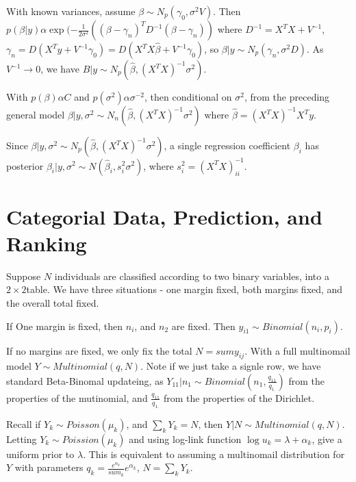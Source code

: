 With known variances, assume $\beta \sim N_{p}(\gamma_{0}, \sigma^{2}
V)$.  Then $p(\beta | y) \alpha \exp(-\frac{1}{2 \sigma^{2}} ((\beta -
\gamma_{n})^{T} D^{-1} (\beta - \gamma_{n}))$ where $D^{-1} = X^{T} X
+ V^{-1}$, $\gamma_{n} = D(X^{T} y + V^{-1} \gamma_{0}) = D(X^{T} X
\hat \beta + V^{-1} \gamma_{0})$, so $\beta | y \sim N_{p}(\gamma_{n},
\sigma^{2} D)$.  As $V^{-1} \rightarrow 0$, we have $B|y \sim
N_{p}(\hat \beta, (X^{T} X)^{-1} \sigma^{2})$.

With $p(\beta) \alpha C$ and $p(\sigma^{2}) \alpha \sigma^{-2}$, then
conditional on $\sigma^{2}$, from the preceding general model $\beta |
y, \sigma^{2} \sim N_{n}(\hat \beta, (X^{T} X)^{-1} \sigma^{2})$ where
$\hat \beta = (X^{T} X)^{-1} X^{T} y$.

Since $\beta | y, \sigma^{2} \sim N_{p}(\hat \beta, (X^{T} X)^{-1}
\sigma^{2})$, a single regression coefficient $\beta_{i}$ has
posterior $\beta_{i} | y, \sigma^{2} \sim N(\hat \beta_{i}, s_{i}^{2}
\sigma^{2})$, where $s_{i}^{2} = (X^{T} X)^{-1}_{ii}$.


\section{Categorial Data, Prediction, and Ranking}
\label{sec:categ-data-pred}

Suppose $N$ individuals are classified according to two binary
variables, into a $2 \times 2$table.  We have three situations - one
margin fixed, both margins fixed, and the overall total fixed.

If One
margin is fixed, then $n_{i}$, and $n_{2}$ are fixed.  Then $y_{i1}
\sim Binomial(n_{i}, p_{i})$.

If no margins are fixed, we only fix the total $N = sum y_{ij}$. With
a full multinomail model $Y \sim Multinomial(q, N)$. Note if we just
take a signle row, we have standard Beta-Binomal updateing, as $Y_{11}
| n_{1} \sim Binomial(n_{1}, \frac{q_{11}}{q_{1.}} )$ from the
properties of the mutinomial, and $\frac{q_{11}}{q_{1.}}$ from the
properties of the Dirichlet.

\begin{defn}
  \label{sec:categ-data-pred-1}
  Recall if $Y_{k} \sim Poisson(\mu_{k})$, and $\sum_{k}^{} Y_{k} =
  N$, then $Y|N \sim Multinomial(q, N)$.  Letting $Y_{k} \sim
  Poission(\mu_{k})$ and using log-link function $\log u_{k} = \lambda
  + \alpha_{k}$, give a uniform prior to $\lambda$.  This is
  equivalent to assuming a multinomail distribution for $Y$ with
  parameters $q_{k} = \frac{e^{\alpha_{k}}}{sum_{k}} e^{\alpha_{k}}$,
  $N = \sum_{k}^{} Y_{k}$.
\end{defn}

